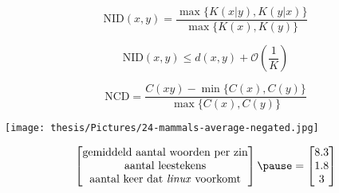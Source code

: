 \documentclass[]{beamer}
\begin{document}
\begin{frame}
  $$\text{NID}(x, y) = \frac{\max \{ K(x|y), K(y|x) \}}{\max \{ K(x), K(y)\}}$$
\end{frame}

\begin{frame}
  $$\text{NID}(x,y) \leq d(x,y) + \mathcal{O}(\frac{1}{K})$$
\end{frame}

\begin{frame}
  $$\text{NCD} = \frac{C(xy) - \min \{ C(x), C(y) \}}{\max \{ C(x), C(y) \}}$$
\end{frame}

\begin{frame}
  \texttt{[image: thesis/Pictures/24-mammals-average-negated.jpg]}
\end{frame}

\begin{frame}

  \begin{displaymath}
    \begin{bmatrix}
      \text{gemiddeld aantal woorden per zin} \\
      \text{aantal leestekens} \\
      \text{aantal keer dat \textit{linux} voorkomt}

    \end{bmatrix}
    \pause
    =
    \begin{bmatrix}
      \text{8.3} \\
      \text{1.8} \\
      \text{3}

    \end{bmatrix}
  \end{displaymath}

\end{frame}
\end{document}
